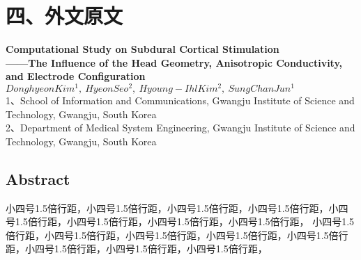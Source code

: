 \section{四、外文原文}
\renewcommand\figurename{Figure}
\begin{spacing}{1.5}
    \begin{center}
        \textbf{Computational Study on Subdural Cortical Stimulation} \\
        \textbf{——The Influence of the Head Geometry, Anisotropic Conductivity, and Electrode Configuration}\\
        $Donghyeon Kim^1,~Hyeon Seo^2,~Hyoung-Ihl Kim^2,~Sung Chan Jun^1$\\
        1、School of Information and Communications, Gwangju Institute of Science and Technology, Gwangju, South Korea\\
        2、Department of Medical System Engineering, Gwangju Institute of Science and Technology, Gwangju, South Korea\\
    \end{center}

    \subsection*{Abstract}
     \hwfs \setlength{\parindent}{2em}
    小四号1.5倍行距，小四号1.5倍行距，小四号1.5倍行距，小四号1.5倍行距，小四号1.5倍行距，小四号1.5倍行距，小四号1.5倍行距，小四号1.5倍行距，
    小四号1.5倍行距，小四号1.5倍行距，小四号1.5倍行距，小四号1.5倍行距，小四号1.5倍行距，小四号1.5倍行距，小四号1.5倍行距，小四号1.5倍行距， 
   
\end{spacing}
\newpage